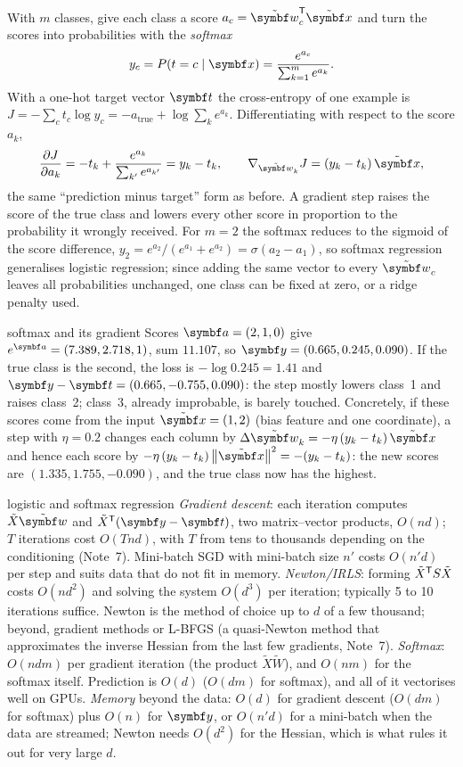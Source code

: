 \documentclass[11pt]{article}
\newcommand{\w}{\vect{w}}
\newcommand{\xt}{\tilde{\x}}
\newcommand{\wt}{\tilde{\w}}
\newcommand{\Xt}{\tilde X}
\begin{document}
With $m$ classes, give each class a score $a_c = \wt_c\T\xt$ and turn the scores into probabilities with the
\emph{softmax}
\[
  y_c = P(t = c \mid \x) = \frac{e^{a_c}}{\sum_{k=1}^m e^{a_k}} .
\]
With a one-hot target vector $\vect{t}$ the cross-entropy of one example is $J = -\sum_c t_c \log y_c = -a_{\mathrm{true}} +
\log\sum_k e^{a_k}$. Differentiating with respect to the score $a_k$,
\[
  \frac{\partial J}{\partial a_k} = -t_k + \frac{e^{a_k}}{\sum_{k'} e^{a_{k'}}} = y_k - t_k , \qquad
  \nabla_{\wt_k} J = (y_k - t_k)\,\xt ,
\]
the same ``prediction minus target'' form as before. A gradient step raises the score of the true class and lowers every
other score in proportion to the probability it wrongly received. For $m = 2$ the softmax reduces to the sigmoid of the
score difference, $y_2 = e^{a_2}/(e^{a_1} + e^{a_2}) = \sigma(a_2 - a_1)$, so softmax regression generalises logistic regression; since adding the same
vector to every $\wt_c$ leaves all probabilities unchanged, one class can be fixed at zero, or a ridge penalty used.

\begin{worked}{softmax and its gradient}
Scores $\vect{a} = (2, 1, 0)$ give $e^{\vect a} = (7.389, 2.718, 1)$, sum $11.107$, so $\vect{y} = (0.665, 0.245, 0.090)$.
If the true class is the second, the loss is $-\log 0.245 = 1.41$ and $\vect{y} - \vect{t} = (0.665, -0.755, 0.090)$: the
step mostly lowers class~1 and raises class~2; class~3, already improbable, is barely touched. Concretely, if these
scores come from the input $\xt = (1, 2)$ (bias feature and one coordinate), a step with $\eta = 0.2$ changes each column
by $\Delta\wt_k = -\eta\,(y_k - t_k)\,\xt$ and hence each score by $-\eta\,(y_k - t_k)\norm{\xt}^2 = -(y_k - t_k)$: the new
scores are $(1.335, 1.755, -0.090)$, and the true class now has the highest.
\end{worked}

\begin{runtime}{logistic and softmax regression}
\emph{Gradient descent}: each iteration computes $\Xt\wt$ and $\Xt\T(\vect{y} - \vect{t})$, two matrix--vector products,
$O(nd)$; $T$ iterations cost $O(Tnd)$, with $T$ from tens to thousands depending on the conditioning (Note~7). Mini-batch
SGD with mini-batch size $n'$ costs $O(n'd)$ per step and suits data that do not fit in memory. \emph{Newton/IRLS}: forming
$\Xt\T S\Xt$ costs $O(nd^2)$ and solving the system $O(d^3)$ per iteration; typically 5 to 10 iterations suffice. Newton is
the method of choice up to $d$ of a few thousand; beyond, gradient methods or L-BFGS (a quasi-Newton method that
approximates the inverse Hessian from the last few gradients, Note~7). \emph{Softmax}: $O(ndm)$ per gradient
iteration (the product $\Xt\tilde W$), and $O(nm)$ for the softmax itself. Prediction is $O(d)$ ($O(dm)$ for softmax), and
all of it vectorises well on GPUs. \emph{Memory} beyond the data: $O(d)$ for gradient descent ($O(dm)$ for softmax) plus
$O(n)$ for $\vect{y}$, or $O(n'd)$ for a mini-batch when the data are streamed; Newton needs $O(d^2)$ for the Hessian, which is
what rules it out for very large $d$.
\end{runtime}
\end{document}
